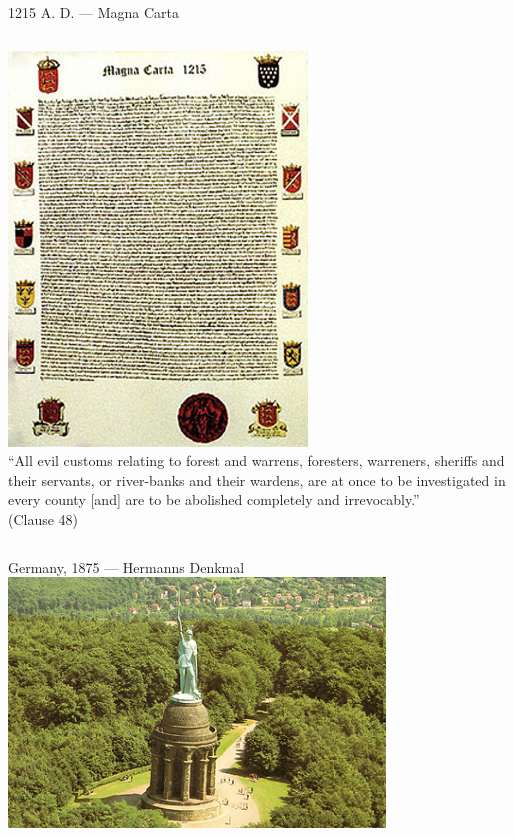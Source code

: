 \begin{frame}{1215 A. D. --- Magna Carta}
    \begin{columns}[onlytextwidth]
            \centering
            \includegraphics[height=0.55\textheight]{img/magna-carta.png} \\

            ``All evil customs relating to forest and warrens, foresters, warreners, sheriffs and their servants, or river-banks and their wardens, are at once to be investigated in every county  [and] are to be abolished completely and irrevocably.'' \\
            (Clause 48)
    \end{columns}
\end{frame}

\begin{frame}{Germany, 1875 --- Hermanns Denkmal}
    \centering
    \includegraphics[width=0.75\textwidth]{img/hermans-denkmal.png} \\
\end{frame}

